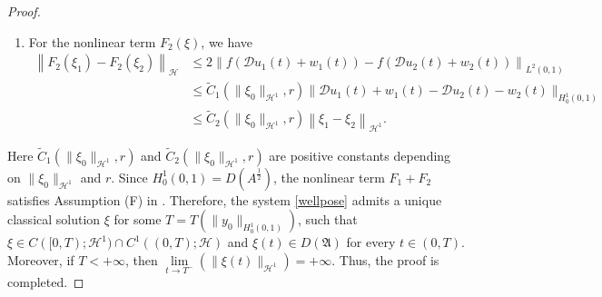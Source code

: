 \documentclass[review]{elsarticle}
\numberwithin{equation}{section}
\begin{document}
\begin{proof}
\begin{enumerate}
\item[(ii)] For the nonlinear term $F_2(\xi)$, we have
$$
\begin{aligned}
 \left\|F_2\left(\xi_1\right)-F_2\left(\xi_2\right)\right\|_{\mathcal{H}} & \leq 2\left\|f(\mathcal{D}u_1(t)+w_1(t))-f(\mathcal{D}u_2(t)+w_2(t))\right\|_{L^2(0,1)}\\
&\leq  \tilde{C}_1(\|\xi_0\|_{\mathcal{H}^1},r)\|\mathcal{D}u_1(t)+w_1(t)-\mathcal{D}u_2(t)-w_2(t)\|_{H^1_0(0,1)}\\
&\leq  \tilde{C}_2(\|\xi_0\|_{\mathcal{H}^1},r)\left\|\xi_1-\xi_2\right\|_{\mathcal{H}^1}.
\end{aligned}
$$
\end{enumerate}
Here $\tilde{C}_1\left(\|\xi_0\|_{\mathcal{H}^1},r\right)$ and $\tilde{C}_2\left(\|\xi_0\|_{\mathcal{H}^1},r\right)$ are positive constants depending on $\|\xi_0\|_{\mathcal{H}^1}$ and $r$. Since $H^1_0(0,1)= D(A^{\frac{1}{2}})$, the nonlinear term $F_1+F_2$ satisfies {Assumption (F)} in \cite[Theorem 6.3.1 and Theorem 6.3.3]{Pazy}. Therefore, the system \eqref{wellpose} admits a unique classical solution $\xi$ for some $T=T\left(\|y_0\|_{H^1_0(0,1)}\right)$, such that $\xi\in C([0,T);\mathcal{H}^1)\cap C^1((0,T);\mathcal{H})$ and $\xi(t)\in D(\mathfrak{A})$ for every $ t\in(0,T)$. Moreover, if $T<+\infty$, then $\lim\limits_{t\to T^-}(\|\xi(t)\|_{\mathcal{H}^1})=+\infty$. Thus, the proof is completed.
\end{proof}
\end{document}
